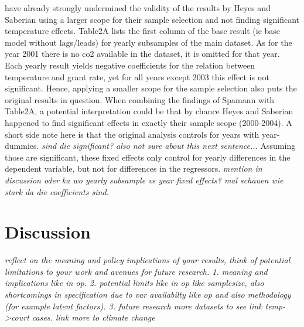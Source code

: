 \documentclass[11pt]{article}
\begin{document}
	\cite{Spamann.2020} have already strongly undermined the validity of the results by Heyes and Saberian using a larger scope for their sample selection and not finding significant temperature effects. Table2A lists the first column of the base result (ie base model without lags/leads) for yearly subsamples of the main dataset. As for the year 2001 there is no co2 available in the dataset, it is omitted for that year. Each yearly result yields negative coefficients for the relation between temperature and grant rate, yet for all years except 2003 this effect is not significant. Hence, applying a smaller scope for the sample selection also puts the original results in question. When combining the findings of Spamann with Table2A, a potential interpretation could be that by chance Heyes and Saberian happened to find significant effects in exactly their sample scope (2000-2004). A short side note here is that the original analysis controls for years with year-dummies. \textit{sind die significant? also not sure about this next sentence...} Assuming those are significant, these fixed effects only control for yearly differences in the dependent variable, but not for differences in the regressors. \textit{mention in discussion oder ka wo yearly subsample vs year fixed effects? mal schauen wie stark da die coefficients sind.}
	
	\section{Discussion}
	\textit{reflect on the meaning and policy implications of your results, think of potential limitations to your work and avenues for future research.
		1. meaning and implications like in op. 
		2. potential limits like in op like samplesize, also shortcomings in specification due to var availabilty like op and also methodology (for example latent factors).
		3. future research more datasets to see link temp->court cases. link more to climate change
	}
	
\end{document}
